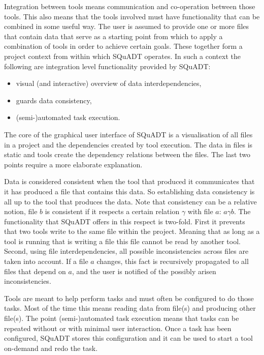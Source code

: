 \documentclass{article}
\newcommand{\squadt}{SQuADT\xspace}
\begin{document}
  Integration between tools means communication and co-operation between those
  tools. This also means that the tools involved must have functionality that
  can be combined in some useful way. The user is assumed to provide one or
  more files that contain data that serve as a starting point from which to
  apply a combination of tools in order to achieve certain goals. These
  together form a project context from within which \squadt operates.
  In such a context the following are integration level functionality provided by \squadt:
   \begin{itemize}
    \item visual (and interactive) overview of data interdependencies,
    \item guards data consistency,
    \item (semi-)automated task execution.
   \end{itemize}
  The core of the graphical user interface of \squadt is a visualisation of all
  files in a project and the dependencies created by tool execution. The data
  in files is static and tools create the dependency relations between the
  files. The last two points require a more elaborate explanation.
  
  Data is considered consistent when the tool that produced it communicates
  that it has produced a file that contains this data. So establishing data
  consistency is all up to the tool that produces the data. Note that
  consistency can be a relative notion, file $b$ is consistent if it respects a
  certain relation $\gamma$ with file $a$: $a \gamma b$. The functionality that
  \squadt offers in this respect is two-fold. First it prevents that two tools
  write to the same file within the project. Meaning that as long as a tool is
  running that is writing a file this file cannot be read by another tool.
  Second, using file interdependencies, all possible inconsistencies across
  files are taken into account.  If a file $a$ changes, this fact is
  recursively propagated to all files that depend on $a$, and the user is
  notified of the possibly arisen inconsistencies.

  Tools are meant to help perform tasks and must often be configured to do
  those tasks. Most of the time this means reading data from file(s) and
  producing other file(s). The point (semi-)automated task execution means that
  tasks can be repeated without or with minimal user interaction. Once a task
  has been configured, \squadt stores this configuration and it can be used to
  start a tool on-demand and redo the task.
\end{document}
